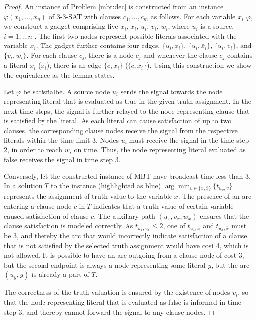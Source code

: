 \begin{proof}\label{prop:mbtnpc}
An instance of Problem \ref{mbt:dec} is constructed from an instance $\varphi(x_1,\dots,x_n)$ of \textsc{3-3-SAT} with clauses $c_1,\dots,c_m$ as follows.
For each variable $x_i$ $\varphi$, we construct a gadget comprising five $x_i$, $\bar{x}_i$, $u_i$, $v_i$, $w_i$, where $u_i$ is a source, $i=1,\dots n$ .
The first two nodes represent possible literals associated with the variable $x_i$.
The gadget further contains four edges, $\{u_i,x_i\}$, $\{u_i,\bar{x}_i\}$, $\{u_i,v_i\}$, and $\{v_i,w_i\}$.
For each clause $c_j$, there is a node $c_j$ and whenever the clause $c_j$ contains a literal $x_i$ ($\bar{x}_i$), there is an edge $\{c,x_i\}$ ($\{c,\bar{x}_i\}$).
Using this construction we show the equivalence as the lemma states.

Let $\varphi$ be satisfialbe.
A source node $u_i$ sends the signal towards the node representing literal that is evaluated as true in the given truth assignment.
In the next time steps, the signal is further relayed to the node representing clause that is satisfied by the literal.
As each literal can cause satisfaction of up to two clauses, the corresponding clause nodes receive the signal from the respective literals within the time limit 3.
Nodes $u_i$ must receive the signal in the time step 2, in order to reach $w_i$ on time.
Thus, the node representing literal evaluated as false receives the signal in time step 3.

Conversely, let the constructed instance of MBT have broadcast time less than 3.
In a solution $T$ to the instance (highlighted as blue)  $\arg\min_{v\in\{x,\bar{x}\}}\{t_{u_x,v}\}$ represents the assignment of truth value to the variable $x$.
The presence of an arc entering a clause node $c$ in $T$ indicates that a truth value of certain variable caused satisfaction of clause $c$.
The auxiliary path $(u_x,v_x,w_x)$ ensures that the clause satisfaction is modeled correctly.
As $t_{u_x,v_x}\leq 2$, one of $t_{u_x,x}$ and $t_{u_x,\bar{x}}$ must be 3, 
and thereby the arc that would incorrectly indicate satisfaction of a clause that is not satisfied by the selected truth assignment would have cost 4, which is not allowed.
It is possible to have an arc outgoing from a clause node of cost 3, but the second endpoint is always a node representing some literal $y$, but the arc $(u_y,y)$ is already a part of $T$.

The correctness of the truth valuation is ensured by the existence of nodes $v_i$, so that the node representing literal that is evaluated as false is informed in time step 3, 
and thereby cannot forward the signal to any clause nodes.
\end{proof}

